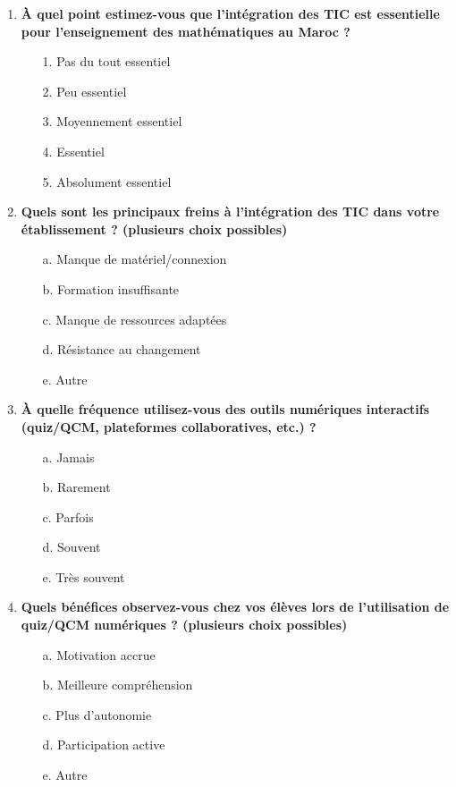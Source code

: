 \documentclass[a4paper,11pt]{report}
\begin{document}
\begin{enumerate}
    \item \textbf{À quel point estimez-vous que l'intégration des TIC est essentielle pour l'enseignement des mathématiques au Maroc ?}
    \begin{itemize}
        \item[1.] Pas du tout essentiel
        \item[2.] Peu essentiel
        \item[3.] Moyennement essentiel
        \item[4.] Essentiel
        \item[5.] Absolument essentiel
    \end{itemize}

    \item \textbf{Quels sont les principaux freins à l'intégration des TIC dans votre établissement ? (plusieurs choix possibles)}
    \begin{itemize}
        \item[a.] Manque de matériel/connexion
        \item[b.] Formation insuffisante
        \item[c.] Manque de ressources adaptées
        \item[d.] Résistance au changement
        \item[e.] Autre
    \end{itemize}

    \item \textbf{À quelle fréquence utilisez-vous des outils numériques interactifs (quiz/QCM, plateformes collaboratives, etc.) ?}
    \begin{itemize}
        \item[a.] Jamais
        \item[b.] Rarement
        \item[c.] Parfois
        \item[d.] Souvent
        \item[e.] Très souvent
    \end{itemize}

    \item \textbf{Quels bénéfices observez-vous chez vos élèves lors de l'utilisation de quiz/QCM numériques ? (plusieurs choix possibles)}
    \begin{itemize}
        \item[a.] Motivation accrue
        \item[b.] Meilleure compréhension
        \item[c.] Plus d'autonomie
        \item[d.] Participation active
        \item[e.] Autre
    \end{itemize}


\end{enumerate}
\end{document}
